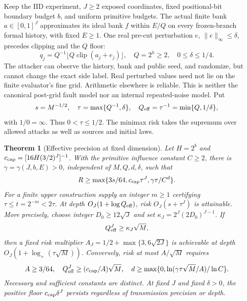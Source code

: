 \documentclass[11pt,letterpaper]{article}
\newtheorem{theorem}{Theorem}[section]
\theoremstyle{definition}\newtheorem{definition}[theorem]{Definition}
\theoremstyle{remark}\newtheorem{remark}[theorem]{Remark}
\begin{document}
Keep the IID experiment, $J\ge2$ exposed coordinates, fixed positional-bit boundary budget $b$, and uniform primitive budgets. The actual finite bank $a\in[0,1]^J$ approximates its ideal bank $f$ within $E/Q$ on every frozen-branch formal history, with fixed $E\ge1$. One real pre-cut perturbation $e$, $\|e\|_\infty\le\delta$, precedes clipping and the $Q$ floor:
\[
 q_j=Q^{-1}\lfloor Q\operatorname{clip}(a_j+e_j)\rfloor,
 \quad Q=2^h\ge2,\quad 0\le\delta\le1/4.
\]
The attacker can observe the history, bank and public seed, and randomize, but cannot change the exact side label. Real perturbed values need not lie on the finite evaluator's fine grid. Arithmetic elsewhere is reliable. This is neither the canonical post-grid fault model nor an internal repeated-noise model.
Put
\[
 s=M^{-1/2},\quad \tau=\max\{Q^{-1},\delta\},\quad
 Q_{\rm eff}=\tau^{-1}=\min\{Q,1/\delta\},
\]
with $1/0=\infty$. Thus $0<\tau\le1/2$. The minimax risk takes the supremum over allowed attacks as well as sources and initial laws.
\begin{theorem}[Effective precision at fixed dimension]\label{thm:effectiveprecision}
Let $H=2^b$ and $c_{\rm cap}=[16H(3/2)^J]^{-1}$. With the primitive influence constant $C\ge2$, there is $\gamma=\gamma(J,b,E)>0$, independent of $M,Q,d,\delta$, such that
\begin{equation}\label{eq:noiseeffectivefloor}
 R\ge\max\{3s/64,c_{\rm cap}\tau^J,\gamma\tau/C^d\}.
\end{equation}
For a finite upper construction supply an integer $m\ge1$ certifying
$\tau\le t=2^{-m}<2\tau$. At depth $O_J(1+\log Q_{\rm eff})$, risk $O_J(s+\tau^J)$ is attainable. More precisely, choose integer $D_0\ge12\sqrt J$ and set $\kappa_J=2^J(2D_0)^{J-1}$. If
\[
 Q_{\rm eff}^J\ge\kappa_J\sqrt M,
\]
then a fixed risk multiplier $A_J=1/2+\max\{3,6\sqrt{2J}\}$ is achievable at depth
$O_J(1+\log_+(\tau\sqrt M))$. Conversely, risk at most $A/\sqrt M$ requires
\[
 A\ge3/64,\quad Q_{\rm eff}^J\ge(c_{\rm cap}/A)\sqrt M,\quad
 d\ge\max\{0,\ln(\gamma\tau\sqrt M/A)/\ln C\}.
\]
Necessary and sufficient constants are distinct. At fixed $J$ and fixed $\delta>0$, the positive floor $c_{\rm cap}\delta^J$ persists regardless of transmission precision or depth.
\end{theorem}
\end{document}
